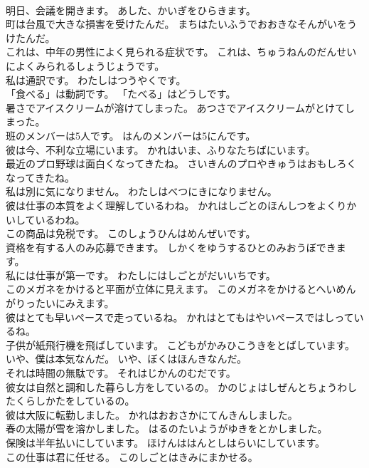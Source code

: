 \documentclass[8pt]{extreport}
\begin{document}
\begin{CJK}{UTF8}{min}
\\	明日、会議を開きます。	あした、かいぎをひらきます。 
\\	町は台風で大きな損害を受けたんだ。	まちはたいふうでおおきなそんがいをうけたんだ。 
\\	これは、中年の男性によく見られる症状です。	これは、ちゅうねんのだんせいによくみられるしょうじょうです。 
\\	私は通訳です。	わたしはつうやくです。 
\\	「食べる」は動詞です。	「たべる」はどうしです。 
\\	暑さでアイスクリームが溶けてしまった。	あつさでアイスクリームがとけてしまった。 
\\	班のメンバーは5人です。	はんのメンバーは5にんです。 
\\	彼は今、不利な立場にいます。	かれはいま、ふりなたちばにいます。 
\\	最近のプロ野球は面白くなってきたね。	さいきんのプロやきゅうはおもしろくなってきたね。 
\\	私は別に気になりません。	わたしはべつにきになりません。 
\\	彼は仕事の本質をよく理解しているわね。	かれはしごとのほんしつをよくりかいしているわね。 
\\	この商品は免税です。	このしょうひんはめんぜいです。 
\\	資格を有する人のみ応募できます。	しかくをゆうするひとのみおうぼできます。 
\\	私には仕事が第一です。	わたしにはしごとがだいいちです。 
\\	このメガネをかけると平面が立体に見えます。	このメガネをかけるとへいめんがりったいにみえます。 
\\	彼はとても早いペースで走っているね。	かれはとてもはやいペースではしっているね。 
\\	子供が紙飛行機を飛ばしています。	こどもがかみひこうきをとばしています。 
\\	いや、僕は本気なんだ。	いや、ぼくはほんきなんだ。 
\\	それは時間の無駄です。	それはじかんのむだです。 
\\	彼女は自然と調和した暮らし方をしているの。	かのじょはしぜんとちょうわしたくらしかたをしているの。 
\\	彼は大阪に転勤しました。	かれはおおさかにてんきんしました。 
\\	春の太陽が雪を溶かしました。	はるのたいようがゆきをとかしました。 
\\	保険は半年払いにしています。	ほけんははんとしはらいにしています。 
\\	この仕事は君に任せる。	このしごとはきみにまかせる。 

\end{CJK}
\end{document}
